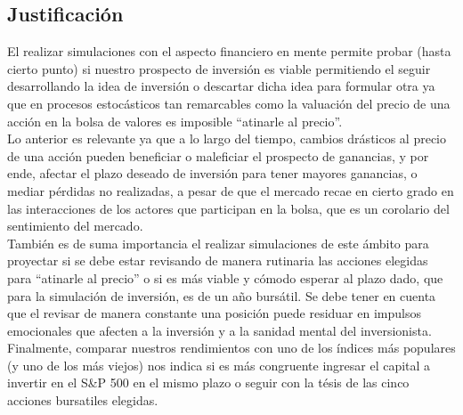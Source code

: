 \documentclass[letterpaper, 12pt]{article}
\begin{document}
\begin{justify}
        \section{Justificación}
        \justify
        El realizar simulaciones con el aspecto financiero en mente permite probar (hasta cierto punto) si nuestro prospecto de inversión es viable permitiendo el seguir desarrollando
        la idea de inversión o descartar dicha idea para formular otra ya que en procesos estocásticos tan remarcables como la valuación del precio de una acción en la bolsa de valores
        es imposible ``atinarle al precio''.
        \\\newline
        Lo anterior es relevante ya que a lo largo del tiempo, cambios drásticos al precio de una acción pueden beneficiar o maleficiar el prospecto de ganancias, y por ende, afectar el plazo deseado de inversión
        para tener mayores ganancias, o mediar pérdidas no realizadas, a pesar de que el mercado recae en cierto grado en las interacciones de los actores que participan en la bolsa, que es un corolario del sentimiento del mercado.
        \\\newline
        También es de suma importancia el realizar simulaciones de este ámbito para proyectar si se debe estar revisando de manera rutinaria las acciones elegidas para ``atinarle al precio'' o si es más viable y cómodo esperar al plazo dado,
        que para la simulación de inversión, es de un año bursátil. Se debe tener en cuenta que el revisar de manera constante una posición puede residuar en impulsos emocionales que afecten a la inversión y a la sanidad mental del inversionista.
        \\\newline
        Finalmente, comparar nuestros rendimientos con uno de los índices más populares (y uno de los más viejos) nos indica si es más congruente ingresar el capital a invertir en el S\&P 500 en el mismo plazo o seguir con la tésis de las cinco acciones
        bursatiles elegidas.

\end{justify}
\end{document}

